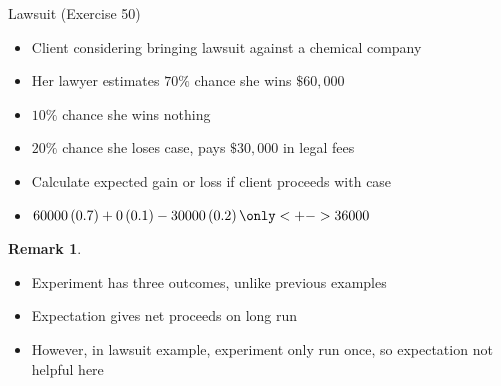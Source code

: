 \documentclass[handout]{beamer}
\theoremstyle{definition}
\newtheorem{remark}{Remark}
\begin{document}
\begin{frame}{Lawsuit (Exercise 50)}
\begin{itemize}
\item Client considering bringing lawsuit against a chemical company
\item Her lawyer estimates $70\%$ chance she wins $\$60,000$
\item $10\%$ chance she wins nothing
\item $20\%$ chance she loses case, pays $\$30,000$ in legal fees
\item Calculate expected gain or loss if client proceeds with case
\item $60000\left(0.7\right)
+0\left(0.1\right)-30000\left(0.2\right)
\only<+->{36000}$
\end{itemize}
\begin{remark}
\begin{itemize}
\item Experiment has \alert{three} outcomes, unlike previous examples
\item Expectation gives net proceeds \alert{on long run}
\item However, in lawsuit example, experiment only run once,
so expectation not helpful here
\end{itemize}
\end{remark}
\end{frame}
\end{document}
